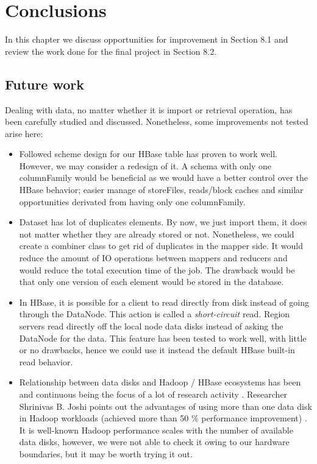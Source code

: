 \chapter{Conclusions}
\label{chapter:conclusions}

In this chapter we discuss opportunities for improvement in Section 8.1 and review the work done for the final project in Section 8.2.

\section{Future work}

Dealing with data, no matter whether it is import or retrieval operation, has been carefully studied and discussed. Nonetheless, some improvements not tested arise here:
\begin{itemize}
\item Followed scheme design for our HBase table has proven to work well. However, we may consider a redesign of it. A schema with only one columnFamily would be beneficial as we would have a better control over the HBase behavior; easier manage of storeFiles, reads/block caches and similar opportunities derivated from having only one columnFamily. 
\item Dataset has lot of duplicates elements. By now, we just import them, it does not matter whether they are already stored or not. Nonetheless, we could create a combiner class to get rid of duplicates in the mapper side. It would reduce the amount of IO operations between mappers and reducers and would reduce the total execution time of the job. The drawback would be that only one version of each element would be stored in the database.
\item In HBase, it is possible for a client to read directly from disk instead of going through the DataNode. This action is called a \textit{short-circuit} read. Region servers read directly off the local node data disks instead of asking the DataNode for the data. This feature has been tested to work well, with little or no drawbacks, hence we could use it instead the default HBase built-in read behavior.
\item Relationship between data disks and Hadoop / HBase ecosystems has been and continuous being the focus of a lot of research activity \cite{kangcase} \cite{fan2009diskreduce} \cite{awasthi2012hybrid}. Researcher Shrinivas B. Joshi points out the advantages of using more than one data disk in Hadoop workloads (achieved more than 50 \% performance improvement) \cite{joshi2012apache}. It is well-known Hadoop performance scales with the number of available data disks, however, we were not able to check it owing to our hardware boundaries, but it may be worth trying it out. 

\end{itemize}
